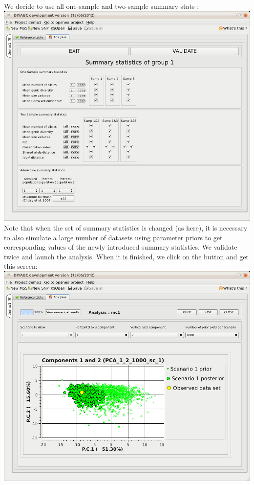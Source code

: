 We decide to use all one-sample and two-sample summary stats :\\

\includegraphics[scale=0.35]{gui_pictures/Capture-DIYABC-57.png} \\
 

Note that when the set of summary statistics is changed (as here), it is necessary to also simulate a large number of datasets using parameter priors to get corresponding values of the newly introduced summary statistics. We validate twice and launch the analysis. When it is finished, we click on the   button and get this screen:\\

\includegraphics[scale=0.33]{gui_pictures/Capture-DIYABC-58.png} \\

